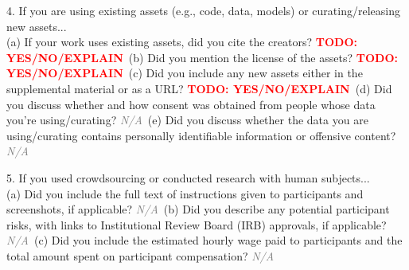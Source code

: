 4.  If you are using existing assets (e.g., code, data, models) or curating/releasing new assets...\\
(a) If your work uses existing assets, did you cite the creators? \textcolor{red}{\textbf{TODO: YES/NO/EXPLAIN}}\
(b) Did you mention the license of the assets? \textcolor{red}{\textbf{TODO: YES/NO/EXPLAIN}}\
(c) Did you include any new assets either in the supplemental material or as a URL? \textcolor{red}{\textbf{TODO: YES/NO/EXPLAIN}}\
(d) Did you discuss whether and how consent was obtained from people whose data you're using/curating? \textcolor{gray}{\textit{N/A}}\
(e) Did you discuss whether the data you are using/curating contains personally identifiable information or offensive content? \textcolor{gray}{\textit{N/A}}

5.  If you used crowdsourcing or conducted research with human subjects...\\
(a) Did you include the full text of instructions given to participants and screenshots, if applicable? \textcolor{gray}{\textit{N/A}}\
(b) Did you describe any potential participant risks, with links to Institutional Review Board (IRB) approvals, if applicable? \textcolor{gray}{\textit{N/A}}\
(c) Did you include the estimated hourly wage paid to participants and the total amount spent on participant compensation? \textcolor{gray}{\textit{N/A}}